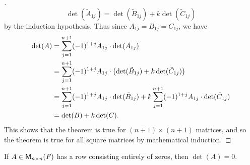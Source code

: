 \begin{proof}[]
	\[
		\det(\tilde{A}_{1 j}) = \det(\tilde{B}_{1 j}) + k \det(\tilde{C}_{1 j})
	\]
	by the induction hypothesis.
	Thus since \(A_{1 j} = B_{1 j} = C_{1 j}\), we have
	\begin{align*}
		\det(A) & = \sum_{j = 1}^{n + 1} (-1)^{1 + j} A_{1 j} \cdot \det(\tilde{A}_{1 j})                                                                           \\
		        & = \sum_{j = 1}^{n + 1} (-1)^{1 + j} A_{1 j} \cdot \left\lparen\det(\tilde{B}_{1 j}) + k \det(\tilde{C}_{1 j})\right\rparen                                            \\
		        & = \sum_{j = 1}^{n + 1} (-1)^{1 + j} A_{1 j} \cdot \det(\tilde{B}_{1 j}) + k \sum_{j = 1}^{n + 1} (-1)^{1 + j} A_{1 j} \cdot \det(\tilde{C}_{1 j}) \\
		        & = \det(B) + k \det(C).
	\end{align*}
	This shows that the theorem is true for \((n + 1) \times (n + 1)\) matrices, and so the theorem is true for all square matrices by mathematical induction.
\end{proof}

\begin{cor}\label{4.2.4}
	If \(A \in \mathsf{M}_{{n} \times n}({\mathit{F}})\) has a row consisting entirely of zeros, then \(\det(A) = 0\).
\end{cor}

